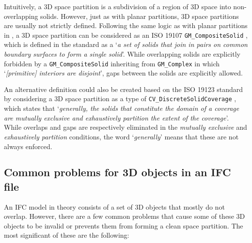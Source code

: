 Intuitively, a 3D space partition is a subdivision of a region of 3D space into non-overlapping solids.
However, just as with planar partitions, 3D space partitions are usually not strictly defined.
Following the same logic as with planar partitions in , a 3D space partition can be considered as an ISO 19107 \texttt{GM\_CompositeSolid} \citep[\S{}6.6.13]{ISO19107:2005}, which is defined in the standard as a `\emph{a set of solids that join in pairs on common boundary surfaces to form a single solid}'.
While overlapping solids are explicitly forbidden by a \texttt{GM\_CompositeSolid} inheriting from \texttt{GM\_Complex} in which `\emph{[primitive] interiors are disjoint}', gaps between the solids are explicitly allowed.

An alternative definition could also be created based on the ISO 19123 standard by considering a 3D space partition as a type of \texttt{CV\_DiscreteSolidCoverage} \citep[\S{}6.10]{ISO19123:2007}, which states that `\emph{generally, the solids that constitute the domain of a coverage are mutually exclusive and exhaustively partition the extent of the coverage}'.
While overlaps and gaps are respectively eliminated in the \emph{mutually exclusive} and \emph{exhaustively partition} conditions, the word `\emph{generally}' means that these are not always enforced.

\subsection{Common problems for 3D objects in an IFC file}

An IFC model in theory consists of a set of 3D objects that mostly do not overlap.
However, there are a few common problems that cause some of these 3D objects to be invalid or prevents them from forming a clean space partition.
The most significant of these are the following:

